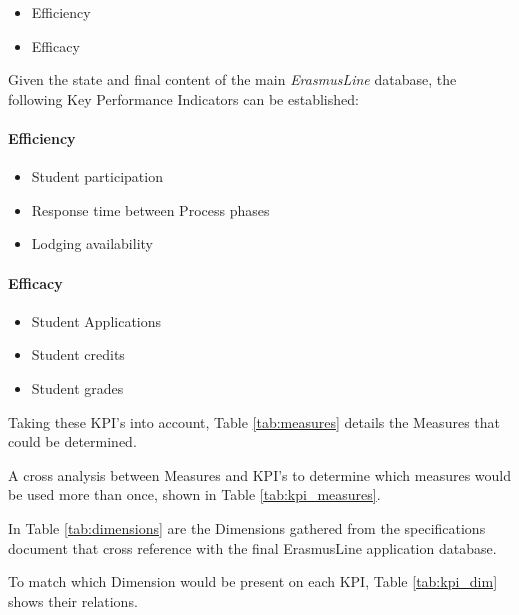 \begin{itemize}
  \item Efficiency
  \item Efficacy
\end{itemize}

Given the state and final content of the main \emph{ErasmusLine} database, the
following Key Performance Indicators can be established:

\paragraph{Efficiency}
\begin{itemize}
  \item Student participation
  \item Response time between Process phases
  \item Lodging availability
\end{itemize}

\paragraph{Efficacy}
\begin{itemize}
  \item Student Applications
  \item Student credits
  \item Student grades
\end{itemize}

Taking these KPI's into account, Table \ref{tab:measures} details the
Measures that could be determined.


A cross analysis between Measures and KPI's to determine which measures would
be used more than once, shown in Table \ref{tab:kpi_measures}.


In Table \ref{tab:dimensions} are the Dimensions gathered from the
specifications document that cross reference with the final ErasmusLine
application database.


\newpage
To match which Dimension would be present on each KPI, Table \ref{tab:kpi_dim}
shows their relations.

